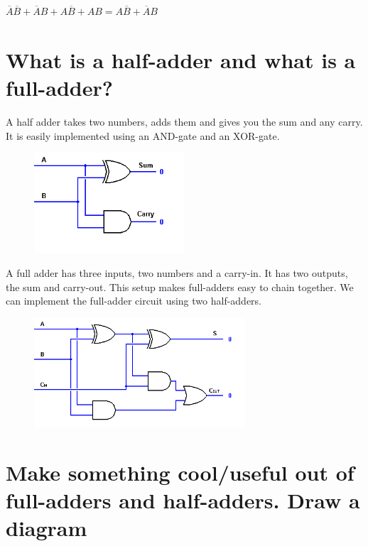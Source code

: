 \documentclass{article}
\begin{document}
$\overline{A}\overline{B} + \overline{A}B + A\overline{B} + AB =
A\overline{B} + \overline{A}B$

\section{What is a half-adder and what is a full-adder?}
A half adder takes two numbers, adds them and gives you the sum and
any carry. It is easily implemented using an AND-gate and an
XOR-gate.
\begin{figure}[hbp]
  \centering
  \includegraphics [width=0.5\textwidth] {images/Half-Adder-Circuit}
\end{figure}

A full adder has three inputs, two numbers and a carry-in. It has two
outputs, the sum and carry-out. This setup makes full-adders easy to
chain together. We can implement the full-adder circuit using two
half-adders.

\begin{figure}[hbp]
  \centering
  \includegraphics [width=0.7\textwidth] {images/Full-Adder-Circuit}
\end{figure}

\section{Make something cool/useful out of full-adders and
  half-adders. Draw a diagram}
\end{document}
